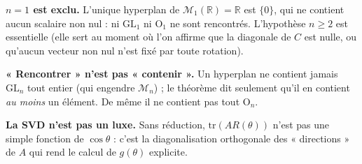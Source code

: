 \vspace{6pt}

\begin{mdframed}[style=cexbar]
  \textbf{$n=1$ est exclu.}\enspace%
  L'unique hyperplan de $\mathcal{M}_1(\mathbb{R}) = \mathbb{R}$ est $\{0\}$,
  qui ne contient aucun scalaire non nul : ni $\mathrm{GL}_1$ ni $\mathrm{O}_1$
  ne sont rencontrés. L'hypothèse $n\geq 2$ est essentielle (elle sert au moment
  où l'on affirme que la diagonale de $C$ est nulle, ou qu'aucun vecteur non nul
  n'est fixé par toute rotation).

  \smallskip\noindent
  \textbf{« Rencontrer » n'est pas « contenir ».}\enspace%
  Un hyperplan ne contient jamais $\mathrm{GL}_n$ tout entier (qui engendre
  $\mathcal{M}_n$) ; le théorème dit seulement qu'il en contient \emph{au moins}
  un élément. De même il ne contient pas tout $\mathrm{O}_n$.

  \smallskip\noindent
  \textbf{La SVD n'est pas un luxe.}\enspace%
  Sans réduction, $\mathrm{tr}(AR(\theta))$ n'est pas une simple fonction de
  $\cos\theta$ : c'est la diagonalisation orthogonale des « directions » de $A$
  qui rend le calcul de $g(\theta)$ explicite.
\end{mdframed}

\vspace{6pt}
\exolabel

